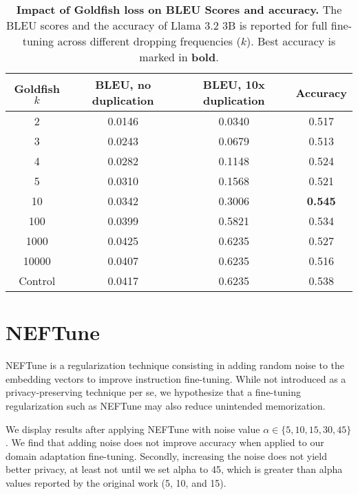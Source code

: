 \begin{table}[ht]
\caption{\textbf{Impact of Goldfish loss on BLEU Scores and accuracy.} The BLEU scores and the accuracy of Llama 3.2 3B is reported for full fine-tuning across different dropping frequencies ($k$). Best accuracy is marked in \textbf{bold}.}
\label{tab:goldfish_fft}
\vskip 0.15in
\begin{center}
\begin{scriptsize}
\begin{tabular}{@{}c|ccc@{}}
\toprule
Goldfish $k$ & BLEU, no duplication & BLEU, 10x duplication & Accuracy       \\ \midrule
2            & 0.0146          & 0.0340          & 0.517          \\
3            & 0.0243          & 0.0679          & 0.513          \\
4            & 0.0282          & 0.1148          & 0.524          \\
5            & 0.0310          & 0.1568          & 0.521          \\
10           & 0.0342          & 0.3006          & \textbf{0.545} \\
100          & 0.0399          & 0.5821          & 0.534          \\
1000         & 0.0425          & 0.6235          & 0.527          \\
10000        & 0.0407          & 0.6235          & 0.516          \\
Control      & 0.0417          & 0.6235          & 0.538          \\ \bottomrule
\end{tabular}
\end{scriptsize}
\end{center}
\vskip -0.1in
\end{table}


\section{NEFTune}
\label{sec:neftune}
NEFTune is a regularization technique consisting in adding random noise to the embedding vectors to improve instruction fine-tuning. While not introduced as a privacy-preserving technique per se, we hypothesize that a fine-tuning regularization such as NEFTune may also reduce unintended memorization.

We display results after applying NEFTune with noise value $\alpha \in \{5, 10, 15, 30, 45\}$. We find that adding noise does not improve accuracy when applied to our domain adaptation fine-tuning. Secondly, increasing the noise does not yield better privacy, at least not until we set alpha to 45, which is greater than alpha values reported by the original work (5, 10, and 15).

